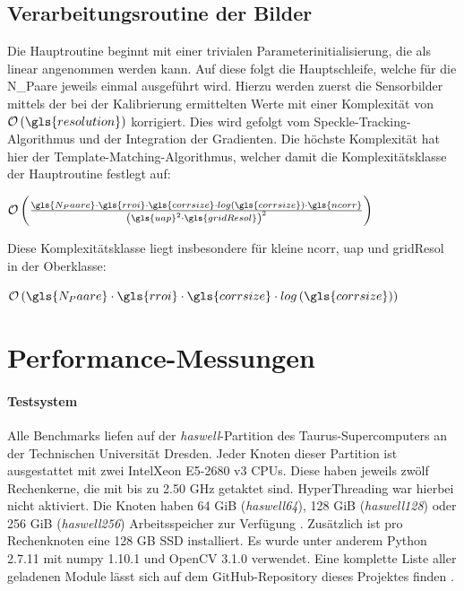\subsection{Verarbeitungsroutine der Bilder}

Die Hauptroutine beginnt mit einer trivialen Parameterinitialisierung, die als linear angenommen werden kann. Auf diese folgt die Hauptschleife, welche für die \gls{N_Paare} jeweils einmal ausgeführt wird. Hierzu werden zuerst die Sensorbilder mittels der bei der Kalibrierung ermittelten Werte mit einer Komplexität von $\mathcal{O}\left(\gls{resolution}\right)$ korrigiert. Dies wird gefolgt vom Speckle-Tracking-Algorithmus und der Integration der Gradienten. Die höchste Komplexität hat hier der Template-Matching-Algorithmus, welcher damit die Komplexitätsklasse der Hauptroutine festlegt auf:

\begin{center}
	$\mathcal{O}\left(\frac{\gls{N_Paare} \cdot\gls{rroi} \cdot \gls{corrsize} \cdot log\left(\gls{corrsize}\right) \cdot \gls{ncorr}}{\left(\gls{uap}^2 \cdot \gls{gridResol}\right)^2}\right)$
\end{center}

Diese Komplexitätsklasse liegt insbesondere für kleine \gls{ncorr}, \gls{uap} und \gls{gridResol} in der Oberklasse:

\begin{center}
	$\mathcal{O}\left(\gls{N_Paare} \cdot \gls{rroi} \cdot \gls{corrsize} \cdot log\left(\gls{corrsize}\right)\right)$
\end{center}

\section{Performance-Messungen}

\paragraph{Testsystem}

\begin{sloppypar}
Alle Benchmarks liefen auf der \textit{haswell}-Partition des Taurus-Supercomputers an der Technischen Universität Dresden. Jeder Knoten dieser Partition ist ausgestattet mit zwei Intel\textregistered \mbox{Xeon\textregistered} E5-2680 v3 \glspl{CPU}. Diese haben jeweils zwölf Rechenkerne, die mit bis zu 2.50 \gls{GHz} getaktet sind. HyperThreading war hierbei nicht aktiviert. Die Knoten haben 64 \gls{GiB} (\textit{haswell64}), 128 \gls{GiB} (\textit{haswell128}) oder 256 \gls{GiB} (\textit{haswell256}) Arbeitsspeicher zur Verfügung \cite{Mar17}. Zusätzlich ist pro Rechenknoten eine 128 \gls{GB} \gls{SSD} installiert. Es wurde unter anderem Python 2.7.11 mit numpy 1.10.1 und OpenCV 3.1.0 verwendet. Eine komplette Liste aller geladenen Module lässt sich auf dem GitHub-Repository dieses Projektes finden \cite{Sch18a}.
\end{sloppypar}

